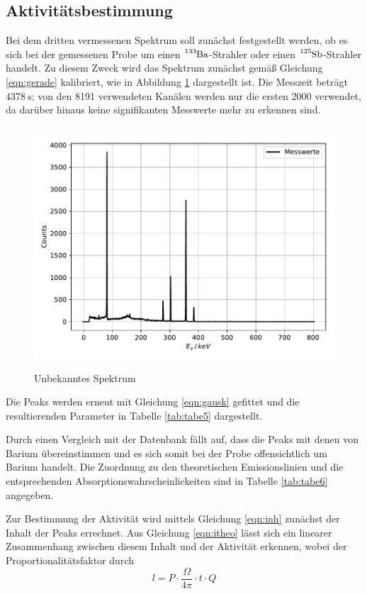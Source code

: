 \subsection{Aktivitätsbestimmung}
Bei dem dritten vermessenen Spektrum soll zunächst festgestellt werden, ob es sich bei der gemessenen
Probe um einen $\ce{^{133}Ba}$-Strahler oder einen $\ce{^{125}Sb}$-Strahler handelt. Zu diesem
Zweck wird das Spektrum zunächst gemäß Gleichung \ref{eqn:gerade} kalibriert, wie in Abbildung
\ref{fig:plot7} dargestellt ist. Die Messzeit beträgt $\SI{4378}{\second}$; von den 8191 verwendeten
Kanälen werden nur die ersten 2000 verwendet, da darüber hinaus keine signifikanten
Messwerte mehr zu erkennen sind.
\begin{figure}
  \centering
  \includegraphics[height=9cm]{Ba.pdf}
  \caption{Unbekanntes Spektrum}
  \label{fig:plot7}
\end{figure}
Die Peaks werden erneut mit Gleichung \ref{eqn:gausk} gefittet und die resultierenden
Parameter in Tabelle \ref{tab:tabe5} dargestellt.

Durch einen Vergleich mit der Datenbank
\cite{lara} fällt auf, dass die Peaks mit denen von Barium übereinstimmen und es sich somit
bei der Probe offensichtlich um Barium handelt. Die Zuordnung zu den theoretischen Emissionslinien
und die entsprechenden Absorptionswahrscheinlickeiten sind in Tabelle \ref{tab:tabe6} angegeben.

Zur Bestimmung der Aktivität wird mittels Gleichung \ref{eqn:inh} zunächst der Inhalt der Peaks errechnet.
Aus Gleichung \ref{eqn:itheo} lässt sich ein linearer Zusammenhang zwischen diesem Inhalt und der Aktivität
erkennen, wobei der Proportionalitätsfaktor durch
\begin{equation}
  l = P\cdot \frac{\Omega}{4\pi}\cdot t \cdot Q
  \label{eqn:lin}
\end{equation}

